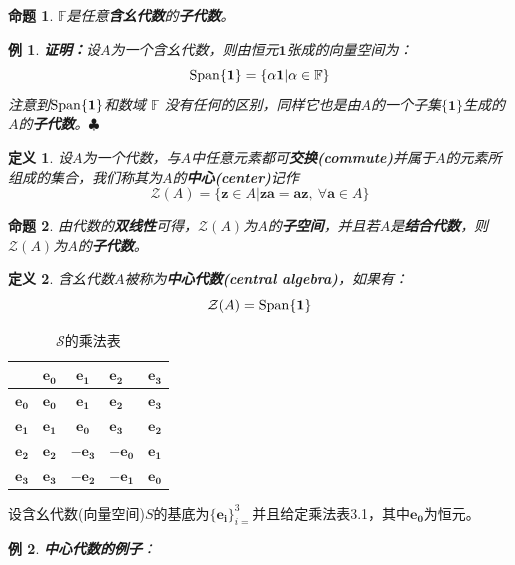 \documentclass[mathserif,hyperref,UTF8,openany,b5paper]{ctexbook}
\newtheorem{exmp}{例}[section]
\newtheorem{defn}{定义}[section]
\newtheorem{pro}{命题}[section]
\begin{document}
\begin{pro}
$\mathbb{F}$是任意\textbf{含幺代数}的\textbf{子代数}。
\end{pro}
\begin{exmp}
\textbf{证明：}设$A$为一个含幺代数，则由恒元$\mathbf{1}$张成的向量空间为：
\begin{equation}
\rm{Span}\{\mathbf{1}\}=\{\alpha\mathbf{1}|\alpha\in\mathbb{F}\}
\end{equation}
注意到$\rm{Span}\{\mathbf{1}\}$和数域 $\mathbb{F}$ 没有任何的区别，同样它也是由$A$的一个子集$\{\mathbf{1}\}$生成的$A$的\textbf{子代数}。$\clubsuit$
\end{exmp}
\begin{defn}
设$A$为一个代数，与$A$中任意元素都可\textbf{交换(commute)}并属于$A$的元素所组成的集合，我们称其为$A$的\textbf{中心(center)}记作\begin{equation}
    \mathcal{Z}(A)=\{\mathbf{z}\in A|\mathbf{za=az},\ \forall\mathbf{a}\in A\}
\end{equation}
\end{defn}
\begin{pro}
由代数的\textbf{双线性}可得，$\mathcal{Z}(A)$为$A$的\textbf{子空间}，并且若$A$是\textbf{结合代数}，则$\mathcal{Z}(A)$为$A$的\textbf{子代数}。
\end{pro}
\begin{defn}
含幺代数$A$被称为\textbf{中心代数(central algebra)}，如果有：
\begin{equation}
\mathcal{Z}(A)=\rm{Span}\{\mathbf{1}\}
\end{equation}
\end{defn}
\begin{table}  
\centering  
\begin{tabular}{@{}c|lcll@{}}
\toprule
 & $\mathbf{e_0}$ & $\mathbf{e_1}$ & $\mathbf{e_2}$ & $\mathbf{e_3}$ \\ \midrule
$\mathbf{e_0}$ & $\mathbf{e_0}$ & $\mathbf{e_1}$ & $\mathbf{e_2}$ & $\mathbf{e_3}$ \\
$\mathbf{e_1}$ & $\mathbf{e_1}$ & $\mathbf{e_0}$ & $\mathbf{e_3}$ & $\mathbf{e_2}$ \\
\multicolumn{1}{l|}{$\mathbf{e_2}$} & $\mathbf{e_2}$ & \multicolumn{1}{l}{$-\mathbf{e_3}$} & $-\mathbf{e_0}$ & $\mathbf{e_1}$ \\
\multicolumn{1}{l|}{$\mathbf{e_3}$} & $\mathbf{e_3}$ & \multicolumn{1}{l}{$-\mathbf{e_2}$} & $-\mathbf{e_1}$ & $\mathbf{e_0}$ \\ \bottomrule
\end{tabular}
\caption{$\mathcal{S}$的乘法表}
\end{table}  
设含幺代数(向量空间)$S$的基底为$\{\mathbf{e_i}\}^3_{i=}$并且给定乘法表3.1，其中$\mathbf{e_0}$为恒元。
\begin{exmp}\textbf{中心代数的例子}：\end{exmp}
\end{document}
